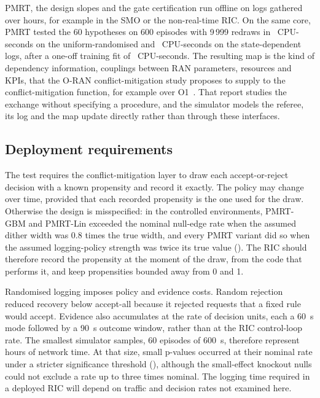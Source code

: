PMRT, the design slopes and the gate certification run offline on logs gathered over hours, for example in the SMO or
the non-real-time RIC. On the same core, PMRT tested the 60 hypotheses on 600 episodes with 9\,999 redraws in
~CPU-seconds on the uniform-randomised and ~CPU-seconds on the state-dependent
logs, after a one-off training fit of ~CPU-seconds. The
resulting map is the kind of dependency information, couplings between RAN parameters, resources and KPIs, that the
O-RAN conflict-mitigation study proposes to supply to the conflict-mitigation function, for example over
O1~\cite{ORANConflictMit}. That report studies the exchange without specifying a procedure, and the simulator models
the referee, its log and the map update directly rather than through these interfaces.

\subsection{Deployment requirements}
\label{sec:disc_deploy}

The test requires the conflict-mitigation layer to draw each accept-or-reject decision with a known propensity and
record it exactly. The policy may change over time, provided that each recorded propensity is the one used for the
draw. Otherwise the design is misspecified: in the controlled environments, PMRT-GBM and PMRT-Lin exceeded the
nominal null-edge rate when the assumed dither width was 0.8 times the true width, and every PMRT variant did so when
the assumed logging-policy strength was twice its true value (). The RIC should therefore record the
propensity at the moment of the draw, from the code that performs it, and keep propensities bounded away from 0 and 1.

Randomised logging imposes policy and evidence costs. Random rejection reduced recovery below accept-all because it
rejected requests that a fixed rule would accept. Evidence also accumulates at the rate of decision units, each a 60~s
mode followed by a 90~s outcome window, rather than at the RIC control-loop rate.
The smallest simulator samples, 60 episodes of 600~s, therefore represent hours of network time. At that size, small
p-values occurred at their nominal rate under a stricter significance threshold (), although the
small-effect knockout nulls could not exclude a rate up to three times nominal. The logging time required in a deployed
RIC will depend on traffic and decision rates not examined here.

